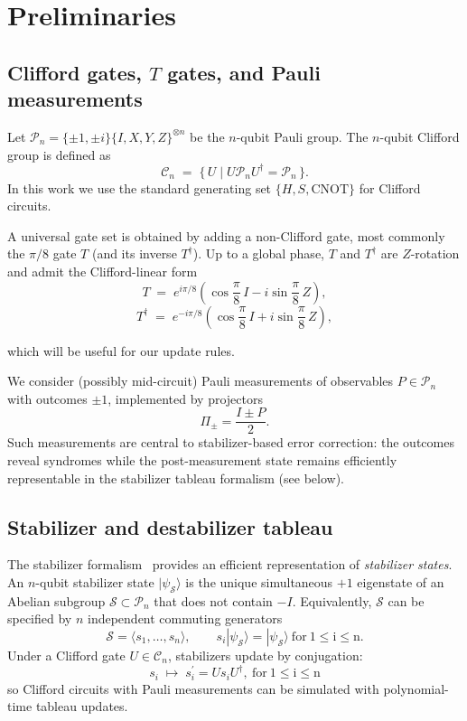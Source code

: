 \documentclass[10pt,conference]{IEEEtran}
\begin{document}
\section{Preliminaries}
\subsection{Clifford gates, $T$ gates, and Pauli measurements}
Let $\mathcal{P}_n=\{\pm 1,\pm i\}\{I,X,Y,Z\}^{\otimes n}$ be the $n$-qubit Pauli group.  
The $n$-qubit Clifford group is defined as
\[
\mathcal{C}_n \;=\; \{\,U \mid U \mathcal{P}_n U^\dagger = \mathcal{P}_n\,\}.
\]
In this work we use the standard generating set $\{H,S,\mathrm{CNOT}\}$ for Clifford circuits.

A universal gate set is obtained by adding a non-Clifford gate, most commonly the $\pi/8$ gate $T$ (and its inverse $T^\dagger$). 
Up to a global phase, $T$ and $T^{\dagger}$ are $Z$-rotation and admit the Clifford-linear form
\begin{equation}\label{eq:T_gate}
T \;=\; e^{i\pi/8}\!\left(\cos\frac{\pi}{8}\,I - i\sin\frac{\pi}{8}\,Z\right),
\end{equation}
\begin{equation}\label{eq:T_dagger}
T^\dagger \;=\; e^{-i\pi/8}\!\left(\cos\frac{\pi}{8}\,I + i\sin\frac{\pi}{8}\,Z\right),
\end{equation}


which will be useful for our update rules.

We consider (possibly mid-circuit) Pauli measurements of observables $P\in \mathcal{P}_n$ with outcomes $\pm1$, implemented by projectors
\[
\Pi_{\pm}=\frac{I\pm P}{2}.
\]
Such measurements are central to stabilizer-based error correction: the outcomes reveal syndromes while the post-measurement state remains efficiently representable in the stabilizer tableau formalism (see below).

\subsection{Stabilizer and destabilizer tableau}
The stabilizer formalism~\cite{gottesman1997stabilizer} provides an efficient representation of \emph{stabilizer states}. 
An $n$-qubit stabilizer state $|\psi_{\mathcal{S}}\rangle$ is the unique simultaneous $+1$ eigenstate of an Abelian subgroup $\mathcal{S}\subset \mathcal{P}_n$ that does not contain $-I$. 
Equivalently, $\mathcal{S}$ can be specified by $n$ independent commuting generators
\[
\mathcal{S}=\langle s_1,\dots,s_n\rangle,\qquad
s_i|\psi_{\mathcal{S}}\rangle=|\psi_{\mathcal{S}}\rangle \ \mathrm{for\ 1\leq i \leq n}.
\]
Under a Clifford gate $U\in\mathcal{C}_n$, stabilizers update by conjugation:
\[
s_i \;\mapsto\; s_i^{\prime}=U s_i U^\dagger, \ \mathrm{for\ 1\leq i \leq n}
\]
so Clifford circuits with Pauli measurements can be simulated with polynomial-time tableau updates.
\end{document}
